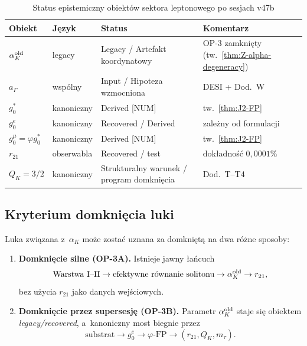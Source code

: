 \begin{table}[h]
\centering
\caption{Status epistemiczny obiekt\'ow sektora leptonowego po sesjach v47b}
\label{tab:Z-status}
\begin{tabular}{@{}llll@{}}
\toprule
\textbf{Obiekt} & \textbf{J\k{e}zyk} & \textbf{Status} & \textbf{Komentarz} \\
\midrule
$\alpha_K^{\rm old}$ & legacy & Legacy / Artefakt koordynatowy & OP-3 zamkni\k{e}ty (tw.~\ref{thm:Z-alpha-degeneracy}) \\
$a_\Gamma$ & wsp\'olny & Input / Hipoteza wzmocniona & DESI + Dod.~W \\
$g_0^*$ & kanoniczny & Derived [NUM] & tw.~\ref{thm:J2-FP} \\
$g_0^e$ & kanoniczny & Recovered / Derived & zale\.zny od formulacji \\
$g_0^\mu = \varphi g_0^*$ & kanoniczny & Derived [NUM] & tw.~\ref{thm:J2-FP} \\
$r_{21}$ & obserwabla & Recovered / test & dok\l{}adno\'s\'c $0{,}0001\%$ \\
$Q_K = 3/2$ & kanoniczny & Strukturalny warunek / program domkni\k{e}cia & Dod.~T--T4 \\
\bottomrule
\end{tabular}
\end{table}

\subsection{Kryterium domkni\k{e}cia luki}
\label{app:Z-closure}

\begin{definition}\label{def:Z-closure}
Luka zwi\k{a}zana z~$\alpha_K$ mo\.ze zosta\'c uznana za domkni\k{e}t\k{a}
na dwa r\'o\.zne sposoby:
\begin{enumerate}[nosep]
  \item \textbf{Domkni\k{e}cie silne (OP-3A).}
    Istnieje jawny \l{}a\'ncuch
    \[
      \text{Warstwa I--II}
      \to \text{efektywne r\'ownanie solitonu}
      \to \alpha_K^{\rm old}
      \to r_{21},
    \]
    bez u\.zycia $r_{21}$ jako danych wej\'sciowych.
  \item \textbf{Domkni\k{e}cie przez supersesj\k{e} (OP-3B).}
    Parametr $\alpha_K^{\rm old}$ staje si\k{e} obiektem
    \emph{legacy/recovered}, a~kanoniczny most biegnie przez
    \[
      \text{substrat}
      \to g_0^e
      \to \varphi\text{-FP}
      \to (r_{21}, Q_K, m_\tau).
    \]
\end{enumerate}
\end{definition}

